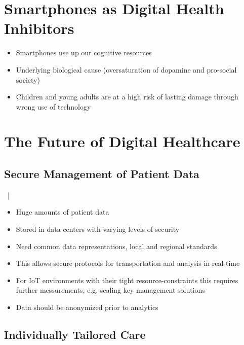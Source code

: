 \documentclass[xcolor=dvipsnames, aspectratio=1610]{beamer}
\begin{document}
\section{Smartphones as Digital Health Inhibitors}%
\label{sec:smartphones_as_digital_health_inhibitors}

\begin{frame}{\secname}
    \begin{itemize}[<+->]
        \item Smartphones use up our cognitive resources
        \item Underlying biological cause (oversaturation of dopamine and pro-social society)
        \item Children and young adults are at a high risk of lasting damage through wrong use of technology
    \end{itemize}
\end{frame}

\section{The Future of Digital Healthcare}%
\label{sec:the_future_of_digital_healthcare}

\subsection{Secure Management of Patient Data}%
\label{sub:secure_management_of_patient_data}

\begin{frame}{\secname\ | \subsecname}
    \begin{itemize}[<+->]
        \item Huge amounts of patient data
        \item Stored in data centers with varying levels of security
        \item Need common data representations, local and regional standards
        \item This allows secure protocols for transportation and analysis in real-time
        \item For IoT environments with their tight resource-constraints this requires further messurements, e.g. scaling key management solutions
        \item Data should be anonymized prior to analytics
    \end{itemize}
\end{frame}

\subsection{Individually Tailored Care}%
\label{sub:individually_tailored_care}
\end{document}
